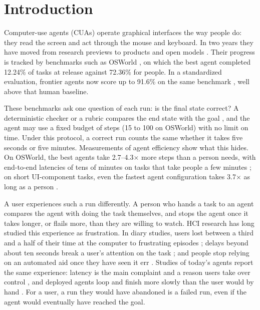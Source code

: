 \section{Introduction}
\label{sec:intro}

Computer-use agents (CUAs) operate graphical interfaces the way people do: they read the screen and act through the mouse and keyboard. In two years they have moved from research previews \citep{anthropic2024computeruse} to products \citep{openai2025cua,google2025geminicomputeruse} and open models \citep{qin2025uitars,wang2025uitars2,wang2025opencua}. Their progress is tracked by benchmarks such as OSWorld \citep{xie2024osworld}, on which the best agent completed 12.24\% of tasks at release against 72.36\% for people. In a standardized evaluation, frontier agents now score up to 91.6\% on the same benchmark \citep{aggarwal2026cuaspeedrun}, well above that human baseline.



These benchmarks ask one question of each run: is the final state correct? A deterministic checker or a rubric compares the end state with the goal \citep{xie2024osworld,zhou2024webarena,rawles2025androidworld,xue2025illusion}, and the agent may use a fixed budget of steps (15 to 100 on OSWorld) with no limit on time. Under this protocol, a correct run counts the same whether it takes five seconds or five minutes. Measurements of agent efficiency show what this hides. On OSWorld, the best agents take 2.7--4.3$\times$ more steps than a person needs, with end-to-end latencies of tens of minutes on tasks that take people a few minutes \citep{abhyankar2026osworldhuman}; on short UI-component tasks, even the fastest agent configuration takes 3.7$\times$ as long as a person \citep{guan2026componentbench}.

A user experiences such a run differently. A person who hands a task to an agent compares the agent with doing the task themselves, and stops the agent once it takes longer, or flails more, than they are willing to watch. HCI research has long studied this experience as frustration. In diary studies, users lost between a third and a half of their time at the computer to frustrating episodes \citep{ceaparu2004frustration,lazar2006severity}; delays beyond about ten seconds break a user's attention on the task \citep{miller1968response,nielsen1993usability}; and people stop relying on an automated aid once they have seen it err \citep{parasuraman1997humans,dietvorst2015algorithm}. Studies of today's agents report the same experience: latency is the main complaint and a reason users take over control \citep{mozannar2025magentic}, and deployed agents loop and finish more slowly than the user would by hand \citep{shome2026johnny}. For a user, a run they would have abandoned is a failed run, even if the agent would eventually have reached the goal.

